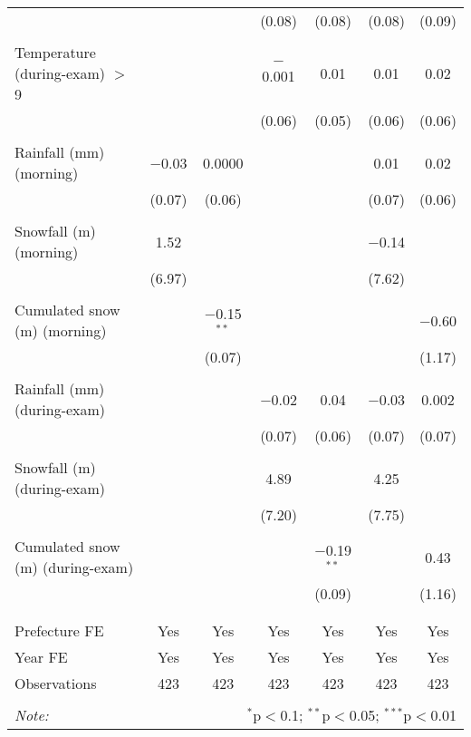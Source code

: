 \begin{tabular}{@{\extracolsep{5pt}}lcccccc}
  &  &  & (0.08) & (0.08) & (0.08) & (0.09) \\ 
  & & & & & & \\ 
 Temperature (during-exam) $>$ 9 &  &  & $-$0.001 & 0.01 & 0.01 & 0.02 \\ 
  &  &  & (0.06) & (0.05) & (0.06) & (0.06) \\ 
  & & & & & & \\ 
 Rainfall (mm) (morning) & $-$0.03 & 0.0000 &  &  & 0.01 & 0.02 \\ 
  & (0.07) & (0.06) &  &  & (0.07) & (0.06) \\ 
  & & & & & & \\ 
 Snowfall (m) (morning) & 1.52 &  &  &  & $-$0.14 &  \\ 
  & (6.97) &  &  &  & (7.62) &  \\ 
  & & & & & & \\ 
 Cumulated snow (m) (morning) &  & $-$0.15$^{**}$ &  &  &  & $-$0.60 \\ 
  &  & (0.07) &  &  &  & (1.17) \\ 
  & & & & & & \\ 
 Rainfall (mm) (during-exam) &  &  & $-$0.02 & 0.04 & $-$0.03 & 0.002 \\ 
  &  &  & (0.07) & (0.06) & (0.07) & (0.07) \\ 
  & & & & & & \\ 
 Snowfall (m) (during-exam) &  &  & 4.89 &  & 4.25 &  \\ 
  &  &  & (7.20) &  & (7.75) &  \\ 
  & & & & & & \\ 
 Cumulated snow (m) (during-exam) &  &  &  & $-$0.19$^{**}$ &  & 0.43 \\ 
  &  &  &  & (0.09) &  & (1.16) \\ 
  & & & & & & \\ 
\hline \\[-1.8ex] 
Prefecture FE & Yes & Yes & Yes & Yes & Yes & Yes \\ 
Year FE & Yes & Yes & Yes & Yes & Yes & Yes \\ 
Observations & 423 & 423 & 423 & 423 & 423 & 423 \\ 
\hline 
\hline \\[-1.8ex] 
\textit{Note:}  & \multicolumn{6}{r}{$^{*}$p$<$0.1; $^{**}$p$<$0.05; $^{***}$p$<$0.01} \\ 
\end{tabular} 
